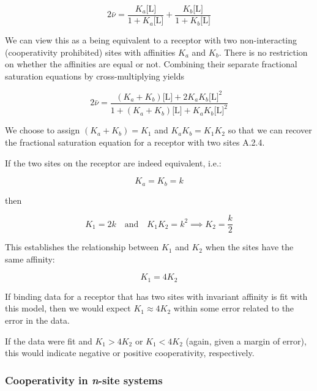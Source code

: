 \begin{equation}
	2  \bar{\nu} = \frac{K_a \text{[L]}}{1+K_a \text{[L]}} + \frac{K_b \text{[L]}}{1+K_b \text{[L]}}
\end{equation}

We can view this as a being equivalent to a receptor with two non-interacting (cooperativity prohibited) sites with affinities \(K_a\) and \(K_b\). There is no restriction on whether the affinities are equal or not. Combining their separate fractional saturation equations by cross-multiplying yields

\begin{equation}
	2  \bar{\nu} = \frac{(K_a + K_b)\text{[L]} + 2 K_a K_b \text{[L]}^2}{1 + (K_a + K_b)\text{[L]} + K_a K_b \text{[L]}^2}
\end{equation}

We choose to assign \((K_a + K_b) = K_1\) and \(K_a K_b = K_1 K_2\) so that we can recover the fractional saturation equation for a receptor with two sites A.2.4. 

If the two sites on the receptor are indeed equivalent, i.e.:

\begin{equation}
K_a = K_b = k
\end{equation}

then 

\begin{equation}
K_1 = 2k \quad \text{and} \quad K_1 K_2 = k^2 \implies K_2 = \frac{k}{2}
\end{equation}

This establishes the relationship between \(K_1\) and \(K_2\) when the sites have the same affinity:

\begin{equation}
	K_1 = 4 K_2
\end{equation}

If binding data for a receptor that has two sites with invariant affinity is fit with this model, then we would expect \(K_1 \approx 4 K_2\) within some error related to the error in the data.

If the data were fit and \(K_1 > 4 K_2 \) or \(K_1 < 4 K_2 \) (again, given a margin of error), this would indicate negative or positive cooperativity, respectively.

\subsubsection*{Cooperativity in \emph{n}-site systems}

